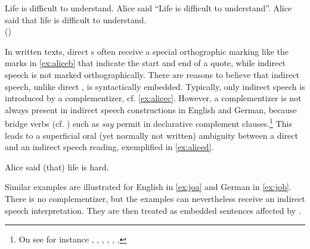 \ea\label{ex:alice} 
\ea\label{ex:alicea} Life is difficult to understand.
\ex\label{ex:aliceb}  Alice said ``Life is difficult to understand''.
\ex\label{ex:alicec}  Alice said that life is difficult to understand.\\
(\citealt[429: ex 1–3]{Cappelen1997})
\z
\z 

In written texts, direct s often receive a special orthographic marking like the  marks in \eqref{ex:aliceb} that indicate the start and end of a quote, while indirect speech is not marked orthographically. There are reasons to believe that  indirect speech, unlike direct , is syntactically embedded. Typically, only indirect speech is introduced by a complementizer, cf. \eqref{ex:alicec}.
However, a complementizer is not always present in  indirect speech constructions in English and German,  because bridge verbs (cf.  \citealt{Erteschik1973}) such as \emph{say} permit 
  in declarative complement clauses.\footnote{On  see for instance \citet{Erteschik1973}, \citet{Kayne1981,Kayne1984}, \citet{Stowell1981}, \citet{Pesetsky1995}, \citet{Boskovic2003}, \citet{Bianchi2017}.}
 This  leads to a superficial oral (yet normally not written) ambiguity  between a direct  and an indirect speech reading, exemplified in \eqref{ex:aliced}.

\ea\label{ex:aliced} Alice said (that) life is hard.
\z

Similar examples are illustrated for English in \eqref{ex:joa} and German in \eqref{ex:job}. There is no complementizer, but the examples can nevertheless receive  an indirect speech interpretation. They are then treated as embedded sentences affected by .

